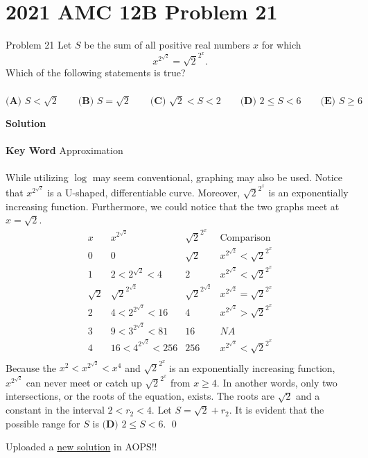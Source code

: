 \documentclass{article}
\newenvironment{solution}{\begin{trivlist}\item[]{\bf Solution}}{\qed \end{trivlist}}
\begin{document}
\newpage
\section*{2021 AMC 12B Problem 21}
Problem 21
Let $S$ be the sum of all positive real numbers $x$ for which\[x^{2^{\sqrt2}}=\sqrt2^{2^x}.\]Which of the following statements is true?
\\\\
$\textbf{(A) }S<\sqrt2 \qquad \textbf{(B) }S=\sqrt2 \qquad \textbf{(C) }\sqrt2<S<2\qquad \textbf{(D) }2\le S<6 \qquad \textbf{(E) }S\ge 6$
\begin{solution}
\\\\
\textbf{Key Word} Approximation
\\\\
While utilizing $\log$ may seem conventional, graphing may also be used. Notice that $x^{2^{\sqrt2}}$ is a U-shaped, differentiable curve. Moreover, $\sqrt2^{2^x}$ is an exponentially increasing function. Furthermore, we could notice that the two graphs meet at $x=\sqrt{2}$.
\[
\begin{array}{c|c|c|c}
    x & x^{2^{\sqrt2}} & \sqrt2^{2^x} & \text{Comparison} \\
    \hline
    0 & 0 & \sqrt{2} & x^{2^{\sqrt2}} < \sqrt2^{2^x} \\
    1 & 2<2^{\sqrt{2}}<4 & 2 & x^{2^{\sqrt2}} < \sqrt2^{2^x} \\
    \sqrt{2} & {\sqrt{2}}^{2^{\sqrt2}} & {\sqrt{2}}^{2^{\sqrt2}} & x^{2^{\sqrt2}} = \sqrt2^{2^x} \\
    2 & 4<2^{2^{\sqrt2}}<16 & 4 & x^{2^{\sqrt2}} > \sqrt2^{2^x} \\
    3 & 9<3^{2^{\sqrt2}}<81 & 16 & NA \\
    4 & 16<4^{2^{\sqrt2}}<256 & 256 & x^{2^{\sqrt2}} < \sqrt2^{2^x} \\
\end{array}
\]
Because the $x^2<x^{2^{\sqrt2}}<x^4$ and $\sqrt2^{2^x}$ is an exponentially increasing function, $x^{2^{\sqrt2}}$ can never meet or catch up $\sqrt2^{2^x}$ from $x\ge4$. In another words, only two intersections, or the roots of the equation, exists. The roots are $\sqrt{2}$ and a constant in the interval $2<r_2<4$. Let $S=\sqrt{2}+r_2$. It is evident that the possible range for $S$ is $\boxed{\textbf{(D) }2\le S<6}$.
\end{solution}
Uploaded a \href{https://artofproblemsolving.com/wiki/index.php/2021_AMC_12B_Problems/Problem_21#Solution_3_.28No_Logarithm.29}{new solution} in AOPS!! \\
\end{document}
